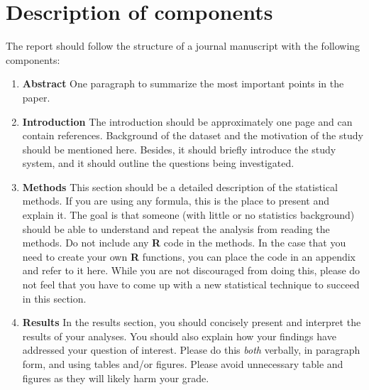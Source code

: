\documentclass[a4paper,10pt]{article}
\begin{document}
\section*{Description of components}
The report should follow the structure of a journal manuscript with the following components: 
\begin{enumerate}
\item \textbf{Abstract}
\newline
One paragraph to summarize the most important points in the paper.

\item \textbf{Introduction}
\newline
The introduction should be approximately one page and can contain references. Background of the dataset and the motivation of the study should be mentioned here. Besides, it should briefly introduce the study system, and it should outline the questions being investigated.

\item \textbf{Methods}
\newline
This section should be a detailed description of the statistical methods. 
If you are using any formula, this is the place to present and explain it.
The goal is that someone (with little or no statistics background) should be able to understand and repeat the analysis from reading the methods. 
Do not include any \textbf{R} code in the methods.
In the case that you need to create your own \textbf{R} functions, 
you can place the code in an appendix and refer to it here. 
While you are not discouraged from doing this, please do not feel that you have to come up with a new statistical technique to succeed in this section.

\item \textbf{Results}
\newline 
In the results section, you should concisely present and interpret the results of your analyses.
You should also explain how your findings have addressed your question of interest. 
Please do this \textit{both} verbally, in paragraph form, and using tables and/or figures. 
Please avoid unnecessary table and figures as they will likely harm your grade.


\end{enumerate}
\end{document}
